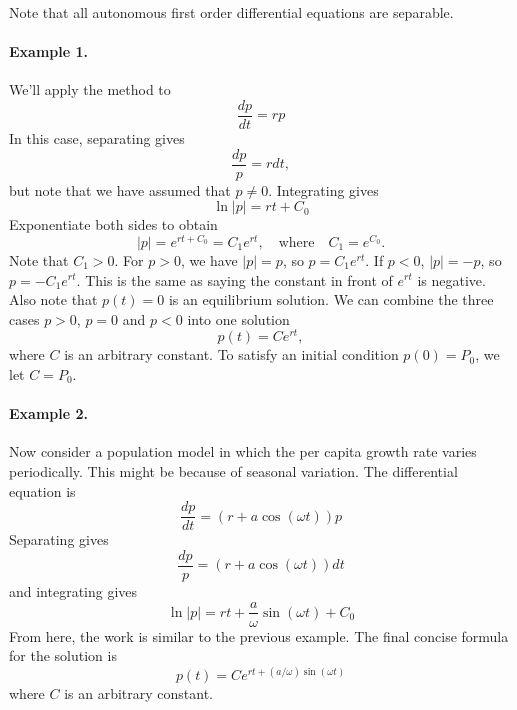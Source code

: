 \documentclass{book}
\begin{document}
Note that all autonomous first order differential equations are separable.

\paragraph{Example 1.}
We'll apply the method to
\begin{equation}
   \frac{dp}{dt} = r p
\end{equation}
In this case, separating gives
\begin{equation}
   \frac{dp}{p} = r dt,
\end{equation}
but note that we have assumed that $p\ne 0$.
Integrating gives
\begin{equation}
   \ln | p | = rt+C_0
\end{equation}
Exponentiate both sides to obtain
\begin{equation}
  |p| = e^{rt+C_0} = C_1e^{rt}, \quad \textrm{where} \quad C_1 = e^{C_0}.
\end{equation}
Note that $C_1 > 0$.
For $p > 0$, we have $|p|=p$, so $p=C_1e^{rt}$.
If $p < 0$, $|p| = -p$, so $p = -C_1e^{rt}$.
This is the same as saying the constant in front of $e^{rt}$ is negative.
Also note that $p(t)=0$ is an equilibrium solution.
We can combine the three cases $p>0$, $p=0$ and $p<0$ into one
solution
\begin{equation}
   p(t) = Ce^{rt},
\end{equation}
where $C$ is an arbitrary constant.
To satisfy an initial condition $p(0)=P_0$, we let $C=P_0$.

\paragraph{Example 2.}
Now consider a population model in which the per capita growth
rate varies periodically.  This might be because of seasonal variation.
The differential equation is
\begin{equation}
   \frac{dp}{dt} = (r + a\cos(\omega t))p
\end{equation}
Separating gives
\begin{equation}
  \frac{dp}{p} = \left( r+a\cos(\omega t) \right) dt
\end{equation}
and integrating gives
\begin{equation}
  \ln | p | = rt + \frac{a}{\omega} \sin(\omega t) + C_0
\end{equation}
From here, the work is similar to the previous example.
The final concise formula for the solution is
\begin{equation}
   p(t) = Ce^{rt + (a/\omega)\sin(\omega t)}
\end{equation}
where $C$ is an arbitrary constant.
%
%
\end{document}
